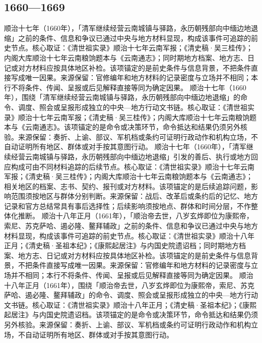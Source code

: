 \subsection{1660—1669}
顺治十七年（1660年），「清军继续经营云南城镇与驿路，永历朝残部向中缅边地退缩」之前的条件、信息和争议已通过中央与地方材料显现，构成该事件可追踪的前史节点。核心取证：《清世祖实录》顺治十七年云南军报；《清史稿·吴三桂传》；内阁大库顺治十七年云南粮饷题本与《云南通志》；同时期地方档案、地方志、日记或对方材料应按具体地区补检。该项锚定的是前史条件与信息背景，不把条件直接写成唯一因果。来源保留：官修编年和地方材料的记录密度与立场并不相同；本行不将条件、传闻、呈报或后见解释直接等同为确定因果。
顺治十七年（1660年），围绕「清军继续经营云南城镇与驿路，永历朝残部向中缅边地退缩」的命令、调度、照会或呈报形成独立的中央—地方行动文书链。核心取证：《清世祖实录》顺治十七年云南军报；《清史稿·吴三桂传》；内阁大库顺治十七年云南粮饷题本与《云南通志》。该项锚定的是命令或决策环节，命令抵达和结果仍须另外核验。来源保留：奏折、上谕、部议、军机档或条约可证明行政动作和机构立场，不自动证明所有地区、群体或对手按其意图行动。
顺治十七年（1660年），「清军继续经营云南城镇与驿路，永历朝残部向中缅边地退缩」引发的善后、执行或地方回应构成可由不同材料追踪的后续节点。核心取证：《清世祖实录》顺治十七年云南军报；《清史稿·吴三桂传》；内阁大库顺治十七年云南粮饷题本与《云南通志》；相关地区的档案、志书、契约、报刊或对方材料。该项锚定的是后续追踪问题，影响范围须按地区与群体分别判断。来源保留：战后、改革后或条约后的记忆、地方记录和官方总结常具有事后选择性；后续影响须按地点、群体和时间分层，不作整体化推断。
顺治十八年正月（1661年），「顺治帝去世，八岁玄烨即位为康熙帝，索尼、苏克萨哈、遏必隆、鳌拜辅政」之前的条件、信息和争议已通过中央与地方材料显现，构成该事件可追踪的前史节点。核心取证：《清世祖实录》顺治十八年正月；《清史稿·圣祖本纪》；《康熙起居注》与内国史院遗诏档；同时期地方档案、地方志、日记或对方材料应按具体地区补检。该项锚定的是前史条件与信息背景，不把条件直接写成唯一因果。来源保留：官修编年和地方材料的记录密度与立场并不相同；本行不将条件、传闻、呈报或后见解释直接等同为确定因果。
顺治十八年正月（1661年），围绕「顺治帝去世，八岁玄烨即位为康熙帝，索尼、苏克萨哈、遏必隆、鳌拜辅政」的命令、调度、照会或呈报形成独立的中央—地方行动文书链。核心取证：《清世祖实录》顺治十八年正月；《清史稿·圣祖本纪》；《康熙起居注》与内国史院遗诏档。该项锚定的是命令或决策环节，命令抵达和结果仍须另外核验。来源保留：奏折、上谕、部议、军机档或条约可证明行政动作和机构立场，不自动证明所有地区、群体或对手按其意图行动。

